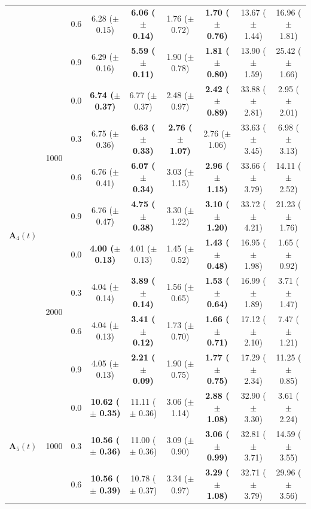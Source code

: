 \begin{table}[htbp]
{\begin{tabular}{lll|cc|cc|cc}
 &  & 0.6 & 6.28 ($\pm$ 0.15) & \textbf{6.06 ($\pm$ 0.14)} & 1.76 ($\pm$ 0.72) & \textbf{1.70 ($\pm$ 0.76)} & 13.67 ($\pm$ 1.44) & 16.96 ($\pm$ 1.81) \\
 &  & 0.9 & 6.29 ($\pm$ 0.16) & \textbf{5.59 ($\pm$ 0.11)} & 1.90 ($\pm$ 0.78) & \textbf{1.81 ($\pm$ 0.80)} & 13.90 ($\pm$ 1.59) & 25.42 ($\pm$ 1.66) \\
\hline
\multirow{8}{*}{$\mathbf{A}_4(t)$} & \multirow{4}{*}{1000} & 0.0 & \textbf{6.74 ($\pm$ 0.37)} & 6.77 ($\pm$ 0.37) & 2.48 ($\pm$ 0.97) & \textbf{2.42 ($\pm$ 0.89)} & 33.88 ($\pm$ 2.81) & 2.95 ($\pm$ 2.01) \\
 &  & 0.3 & 6.75 ($\pm$ 0.36) & \textbf{6.63 ($\pm$ 0.33)} & \textbf{2.76 ($\pm$ 1.07)} & 2.76 ($\pm$ 1.06) & 33.63 ($\pm$ 3.45) & 6.98 ($\pm$ 3.13) \\
 &  & 0.6 & 6.76 ($\pm$ 0.41) & \textbf{6.07 ($\pm$ 0.34)} & 3.03 ($\pm$ 1.15) & \textbf{2.96 ($\pm$ 1.15)} & 33.66 ($\pm$ 3.79) & 14.11 ($\pm$ 2.52) \\
 &  & 0.9 & 6.76 ($\pm$ 0.47) & \textbf{4.75 ($\pm$ 0.38)} & 3.30 ($\pm$ 1.22) & \textbf{3.10 ($\pm$ 1.20)} & 33.72 ($\pm$ 4.21) & 21.23 ($\pm$ 1.76) \\
\cline{2-9}
 & \multirow{4}{*}{2000} & 0.0 & \textbf{4.00 ($\pm$ 0.13)} & 4.01 ($\pm$ 0.13) & 1.45 ($\pm$ 0.52) & \textbf{1.43 ($\pm$ 0.48)} & 16.95 ($\pm$ 1.98) & 1.65 ($\pm$ 0.92) \\
 &  & 0.3 & 4.04 ($\pm$ 0.14) & \textbf{3.89 ($\pm$ 0.14)} & 1.56 ($\pm$ 0.65) & \textbf{1.53 ($\pm$ 0.64)} & 16.99 ($\pm$ 1.89) & 3.71 ($\pm$ 1.47) \\
 &  & 0.6 & 4.04 ($\pm$ 0.13) & \textbf{3.41 ($\pm$ 0.12)} & 1.73 ($\pm$ 0.70) & \textbf{1.66 ($\pm$ 0.71)} & 17.12 ($\pm$ 2.10) & 7.47 ($\pm$ 1.21) \\
 &  & 0.9 & 4.05 ($\pm$ 0.13) & \textbf{2.21 ($\pm$ 0.09)} & 1.90 ($\pm$ 0.75) & \textbf{1.77 ($\pm$ 0.75)} & 17.29 ($\pm$ 2.34) & 11.25 ($\pm$ 0.85) \\
\hline
\multirow{8}{*}{$\mathbf{A}_5(t)$} & \multirow{4}{*}{1000} & 0.0 & \textbf{10.62 ($\pm$ 0.35)} & 11.11 ($\pm$ 0.36) & 3.06 ($\pm$ 1.14) & \textbf{2.88 ($\pm$ 1.08)} & 32.90 ($\pm$ 3.30) & 3.61 ($\pm$ 2.24) \\
 &  & 0.3 & \textbf{10.56 ($\pm$ 0.36)} & 11.00 ($\pm$ 0.36) & 3.09 ($\pm$ 0.90) & \textbf{3.06 ($\pm$ 0.99)} & 32.81 ($\pm$ 3.71) & 14.59 ($\pm$ 3.55) \\
 &  & 0.6 & \textbf{10.56 ($\pm$ 0.39)} & 10.78 ($\pm$ 0.37) & 3.34 ($\pm$ 0.97) & \textbf{3.29 ($\pm$ 1.08)} & 32.71 ($\pm$ 3.79) & 29.96 ($\pm$ 3.56) \\

\end{tabular}}
\end{table}
